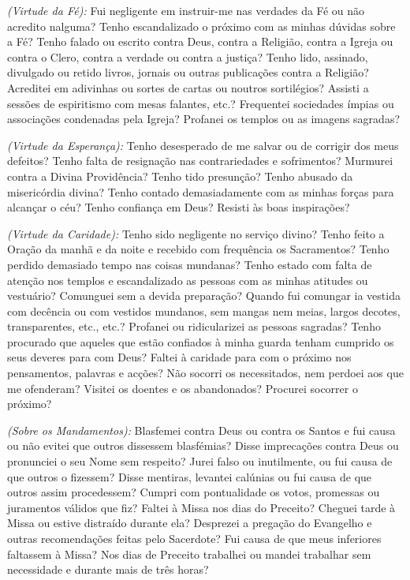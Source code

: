 \emph{(Virtude da Fé):} Fui negligente em instruir-me nas verdades da Fé ou não acredito nalguma? Tenho escandalizado o próximo com as minhas dúvidas sobre a Fé? Tenho falado ou escrito contra Deus, contra a Religião, contra a Igreja ou contra o Clero, contra a verdade ou contra a justiça? Tenho lido, assinado, divulgado ou retido livros, jornais ou outras publicações contra a Religião? Acreditei em adivinhas ou sortes de cartas ou noutros sortilégios? Assisti a sessões de espiritismo com mesas falantes, etc.? Frequentei sociedades ímpias ou associações condenadas pela Igreja? Profanei os templos ou as imagens sagradas?

\emph{(Virtude da Esperança):} Tenho desesperado de me salvar ou de corrigir dos meus defeitos? Tenho falta de resignação nas contrariedades e sofrimentos? Murmurei contra a Divina Providência? Tenho tido presunção? Tenho abusado da misericórdia divina? Tenho contado demasiadamente com as minhas forças para alcançar o céu? Tenho confiança em Deus? Resisti às boas inspirações?

\emph{(Virtude da Caridade):} Tenho sido negligente no serviço divino? Tenho feito a Oração da manhã e da noite e recebido com frequência os Sacramentos? Tenho perdido demasiado tempo nas coisas mundanas? Tenho estado com falta de atenção nos templos e escandalizado as pessoas com as minhas atitudes ou vestuário? Comunguei sem a devida preparação? Quando fui comungar ia vestida com decência ou com vestidos mundanos, sem mangas nem meias, largos decotes, transparentes, etc., etc.? Profanei ou ridicularizei as pessoas sagradas? Tenho procurado que aqueles que estão confiados à minha guarda tenham cumprido os seus deveres para com Deus? Faltei à caridade para com o próximo nos pensamentos, palavras e acções? Não socorri os necessitados, nem perdoei aos que me ofenderam? Visitei os doentes e os abandonados? Procurei socorrer o próximo?

\emph{(Sobre os Mandamentos):} Blasfemei contra Deus ou contra os Santos e fui causa ou não evitei que outros dissessem blasfémias? Disse imprecações contra Deus ou pronunciei o seu Nome sem respeito? Jurei falso ou inutilmente, ou fui causa de que outros o fizessem? Disse mentiras, levantei calúnias ou fui causa de que outros assim procedessem? Cumpri com pontualidade os votos, promessas ou juramentos válidos que fiz? Faltei à Missa nos dias do Preceito? Cheguei tarde à Missa ou estive distraído durante ela? Desprezei a pregação do Evangelho e outras recomendações feitas pelo Sacerdote? Fui causa de que meus inferiores faltassem à Missa? Nos dias de Preceito trabalhei ou mandei trabalhar sem necessidade e durante mais de três horas?

